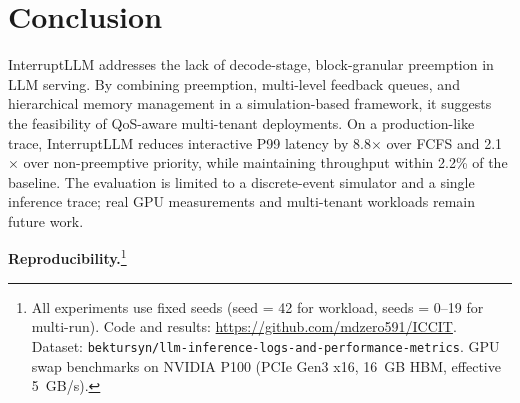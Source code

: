 \documentclass[conference]{IEEEtran}
\begin{document}
\section{Conclusion}\label{sec:conclusion}

InterruptLLM addresses the lack of decode-stage, block-granular preemption in LLM serving. By combining preemption, multi-level feedback queues, and hierarchical memory management in a simulation-based framework, it suggests the feasibility of QoS-aware multi-tenant deployments. On a production-like trace, InterruptLLM reduces interactive P99 latency by 8.8$\times$ over FCFS and 2.1$\times$ over non-preemptive priority, while maintaining throughput within 2.2\% of the baseline. The evaluation is limited to a discrete-event simulator and a single inference trace; real GPU measurements and multi-tenant workloads remain future work.

\vspace{1em}
\noindent\textbf{Reproducibility.}\footnote{All experiments use fixed seeds (seed = 42 for workload, seeds = 0--19 for multi-run). Code and results: \url{https://github.com/mdzero591/ICCIT}. Dataset: \texttt{bektursyn/llm-inference-logs-and-performance-metrics}. GPU swap benchmarks on NVIDIA P100 (PCIe Gen3 x16, 16~GB HBM, effective 5~GB/s).}


\footnotesize

\end{document}
